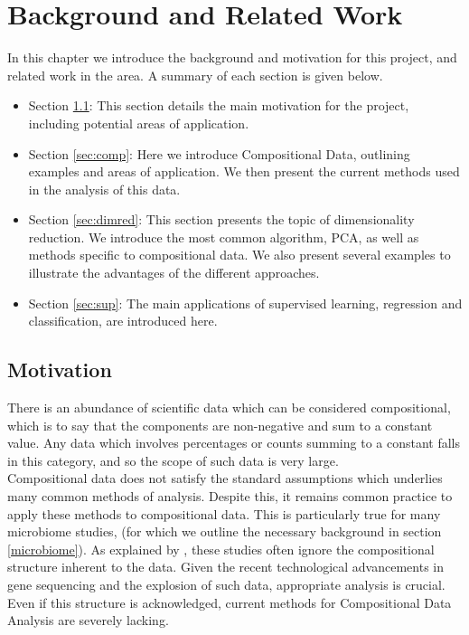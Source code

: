 \chapter{Background and Related Work}
\label{cha:background}
In this chapter we introduce the background and motivation for this project, and related work in the area. A summary of each section is given below.

\begin{itemize}
    \item Section \ref{sec:motivation}: This section details the main motivation for the project, including potential areas of application.
    \item Section \ref{sec:comp}: Here we introduce Compositional Data, outlining examples and areas of application. We then present the current methods used in the analysis of this data. 
    \item Section \ref{sec:dimred}: This section presents the topic of dimensionality reduction. We introduce the most common algorithm, PCA, as well as methods specific to compositional data. We also present several examples to illustrate the advantages of the different approaches.  
    \item Section \ref{sec:sup}: The main applications of supervised learning, regression and classification, are introduced here. 
\end{itemize} \pagebreak


\section{Motivation}
\label{sec:motivation}
There is an abundance of scientific data which can be considered compositional, which is to say that the components are non-negative and sum to a constant value. Any data which involves percentages or counts summing to a constant falls in this category, and so the scope of such data is very large. \\

Compositional data does not satisfy the standard assumptions which underlies many common methods of analysis. Despite this, it remains common practice to apply these methods to compositional data. This is particularly true for many microbiome studies, (for which we outline the necessary background in section \ref{microbiome}). As explained by \cite{Gloor2017}, these studies often ignore the compositional structure inherent to the data. Given the recent technological advancements in gene sequencing and the explosion of such data, appropriate analysis is crucial. Even if this structure is acknowledged, current methods for Compositional Data Analysis are severely lacking.   \\

